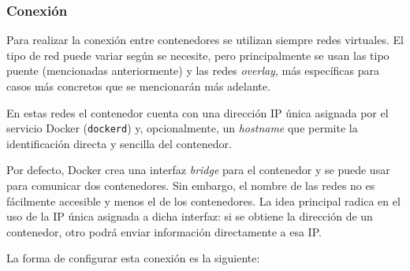 \subsubsection*{Conexión}
Para realizar la conexión entre contenedores se utilizan siempre redes virtuales.
El tipo de red puede variar según se necesite, pero principalmente se usan las
tipo puente (mencionadas anteriormente) y las redes \textit{overlay}, más específicas
para casos más concretos que se mencionarán más adelante.

En estas redes el contenedor cuenta con una dirección IP única asignada por el servicio
Docker (\texttt{dockerd}) y, opcionalmente, un \textit{hostname} que permite la
identificación directa y sencilla del contenedor.

Por defecto, Docker crea una interfaz \textit{bridge} para el contenedor y se puede
usar para comunicar dos contenedores. Sin embargo, el nombre de las redes no es
fácilmente accesible y menos el de los contenedores. La idea principal radica en
el uso de la IP única asignada a dicha interfaz: si se obtiene la dirección de
un contenedor, otro podrá enviar información directamente a esa IP.

La forma de configurar esta conexión es la siguiente:

